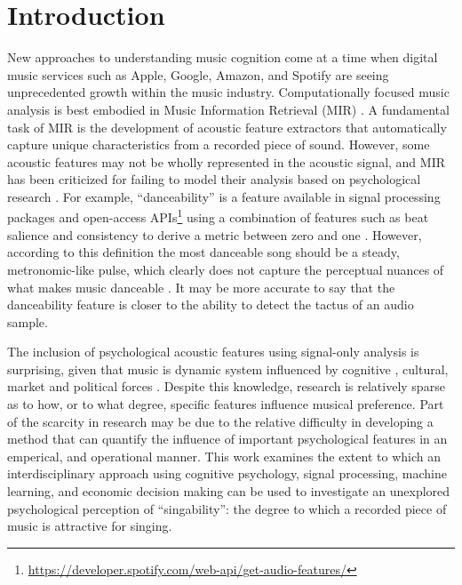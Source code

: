 \section{Introduction}
New approaches to understanding music cognition come at a time when digital music services such as Apple, Google, Amazon, and Spotify are seeing unprecedented growth within the music industry. Computationally focused music analysis is best embodied in Music Information Retrieval (MIR) \cite{downie2003music}. A fundamental task of MIR is the development of acoustic feature extractors that automatically capture unique characteristics from a recorded piece of sound. However, some acoustic features may not be wholly represented in the acoustic signal, and MIR has been criticized for failing to model their analysis based on psychological research \cite{aucouturier2013seven}. For example, ``danceability'' is a feature available in signal processing packages \cite{bogdanov2013essentia,bogdanov2009low} and open-access APIs\footnote{\url{https://developer.spotify.com/web-api/get-audio-features/}} using a combination of features such as beat salience and consistency to derive a metric between zero and one \cite{streich2005detrended}. However, according to this definition the most danceable song should be a steady, metronomic-like pulse, which clearly does not capture the perceptual nuances of what makes music danceable \cite{friberg2014using}. It may be more accurate to say that the danceability feature is closer to the ability to detect the tactus of an audio sample. 

The inclusion of psychological acoustic features using signal-only analysis is surprising, given that music is dynamic system influenced by cognitive \cite{koelsch2005towards}, cultural, market and political forces \cite{bielby2004managing}. Despite this knowledge, research is relatively sparse as to how, or to what degree, specific features influence musical preference. Part of the scarcity in research may be due to the relative difficulty in developing a method that can quantify the influence of important psychological features in an emperical, and operational manner. This work examines the extent to which an interdisciplinary approach using cognitive psychology, signal processing, machine learning, and economic decision making can be used to investigate an unexplored psychological perception of ``singability'': the degree to which a recorded piece of music is attractive for singing. 

